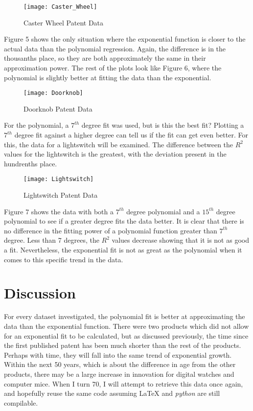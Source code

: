 \documentclass[12pt]{article}
\begin{document}
	\begin{wrapfigure}{l}{0.45\textwidth}
		\texttt{[image: Caster\_Wheel]}
		\caption{\label{fig5}Caster Wheel Patent Data}
	\end{wrapfigure}
	\par Figure 5 shows the only situation where the exponential function is closer to the actual data than the polynomial regression. Again, the difference is in the thousanths place, so they are both approximately the same in their approximation power. The rest of the plots look like Figure 6, where the polynomial is slightly better at fitting the 
data than the exponential.\\
\par
	\begin{wrapfigure}{l}{0.45\textwidth}
		\texttt{[image: Doorknob]}
		\caption{\label{fig6}Doorknob Patent Data}
	\end{wrapfigure}
For the polynomial, a $7^{th}$ degree fit was used, but is this the best fit? Plotting a $7^{th}$ degree fit against a higher degree can tell us if the fit can get even better. For this, the data for a lightswitch will be examined. The difference between the $R^{2}$ values for the lightswitch is the greatest, with the deviation present in the hundrenths place. \\
	\begin{wrapfigure}{r}{0.5\textwidth}
		\texttt{[image: Lightswitch]}
		\caption{\label{fig7}Lightswitch Patent Data}
	\end{wrapfigure}
Figure 7 shows the data with both a $7^{th}$ degree polynomial and a $15^{th}$ degree polynomial to see if a greater degree fits the data better. It is clear that there is no difference in the fitting power of a polynomial function greater than $7^{th}$ degree. Less than 7 degrees, the $R^2$ values decrease showing that it is not as good a fit. Nevertheless, the exponential fit is not as great as the polynomial when it comes to this specific trend in the data.

\section{Discussion}\label{Sec_Discussion}
\par For every dataset investigated, the polynomial fit is better at approximating the data than the exponential function. There were two products which did not allow for an exponential fit to be calculated, but as discussed previously, the time since the first published patent has been much shorter than the rest of the products. Perhaps with time, they will fall into the same trend of exponential growth. Within the next 50 years, which is about the difference in age from the other products, there may be a large increase in innovation for digital watches and computer mice. When I turn 70, I will attempt to retrieve this data once again, and hopefully reuse the same code assuming {\LaTeX} and \textit{python} are still compilable.
\end{document}
